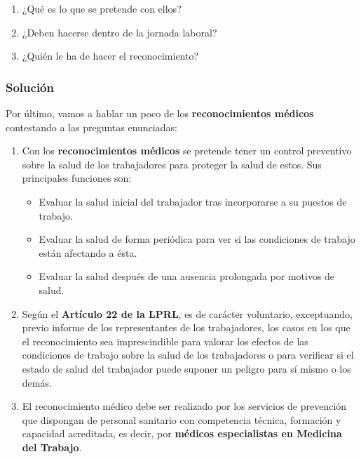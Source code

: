 \begin{enumerate}[label=\alph*.]
    \item ¿Qué es lo que se pretende con ellos?
    \item ¿Deben hacerse dentro de la jornada laboral?
    \item ¿Quién le ha de hacer el reconocimiento?
\end{enumerate}

\subsubsection{Solución}
Por último, vamos a hablar un poco de los \textbf{reconocimientos médicos} contestando a las preguntas enunciadas:

\begin{enumerate}[label=\alph*.]
    \item Con los \textbf{reconocimientos médicos} se pretende tener un control preventivo sobre la salud de los trabajadores para proteger la salud de estos. Sus principales funciones son:

    \begin{itemize}
        \item Evaluar la salud inicial del trabajador tras incorporarse a su puestos de trabajo.
        \item Evaluar la salud de forma periódica para ver si las condiciones de trabajo están afectando a ésta.
        \item Evaluar la salud después de una ausencia prolongada por motivos de salud.
    \end{itemize}

    \item Según el \textbf{Artículo 22 de la LPRL}, es de carácter voluntario, exceptuando, previo informe de los representantes de los trabajadores, los casos en los que el reconocimiento sea imprescindible para valorar los efectos de las condiciones de trabajo sobre la salud de los trabajadores o para verificar si el estado de salud del trabajador puede suponer un peligro para sí mismo o los demás.

    \item El reconocimiento médico debe ser realizado por los servicios de prevención que dispongan de personal sanitario con competencia técnica, formación y capacidad acreditada, es decir, por \textbf{médicos especialistas en Medicina del Trabajo}.
\end{enumerate}


\newpage



